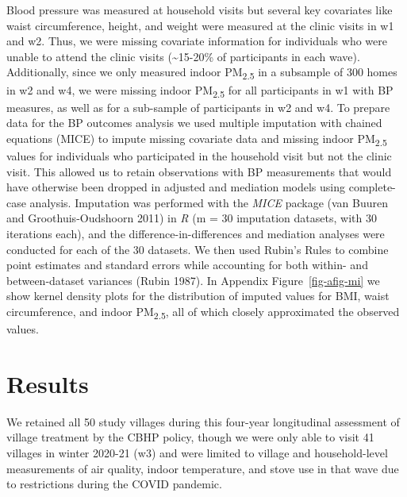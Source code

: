 \documentclass[
  letterpaper,
  DIV=11,
  numbers=noendperiod]{scrartcl}
\begin{document}
Blood pressure was measured at household visits but several key
covariates like waist circumference, height, and weight were measured at
the clinic visits in w1 and w2. Thus, we were missing covariate
information for individuals who were unable to attend the clinic visits
(\textasciitilde15-20\% of participants in each wave). Additionally,
since we only measured indoor PM\textsubscript{2.5} in a subsample of
300 homes in w2 and w4, we were missing indoor PM\textsubscript{2.5} for
all participants in w1 with BP measures, as well as for a sub-sample of
participants in w2 and w4. To prepare data for the BP outcomes analysis
we used multiple imputation with chained equations (MICE) to impute
missing covariate data and missing indoor PM\textsubscript{2.5} values
for individuals who participated in the household visit but not the
clinic visit. This allowed us to retain observations with BP
measurements that would have otherwise been dropped in adjusted and
mediation models using complete-case analysis. Imputation was performed
with the \emph{MICE} package (van Buuren and Groothuis-Oudshoorn 2011)
in \emph{R} (m = 30 imputation datasets, with 30 iterations each), and
the difference-in-differences and mediation analyses were conducted for
each of the 30 datasets. We then used Rubin's Rules to combine point
estimates and standard errors while accounting for both within- and
between-dataset variances (Rubin 1987). In Appendix
Figure~\ref{fig-afig-mi} we show kernel density plots for the
distribution of imputed values for BMI, waist circumference, and indoor
PM\textsubscript{2.5}, all of which closely approximated the observed
values.

\section{Results}\label{results-1}

We retained all 50 study villages during this four-year longitudinal
assessment of village treatment by the CBHP policy, though we were only
able to visit 41 villages in winter 2020-21 (w3) and were limited to
village and household-level measurements of air quality, indoor
temperature, and stove use in that wave due to restrictions during the
COVID pandemic.
\end{document}
